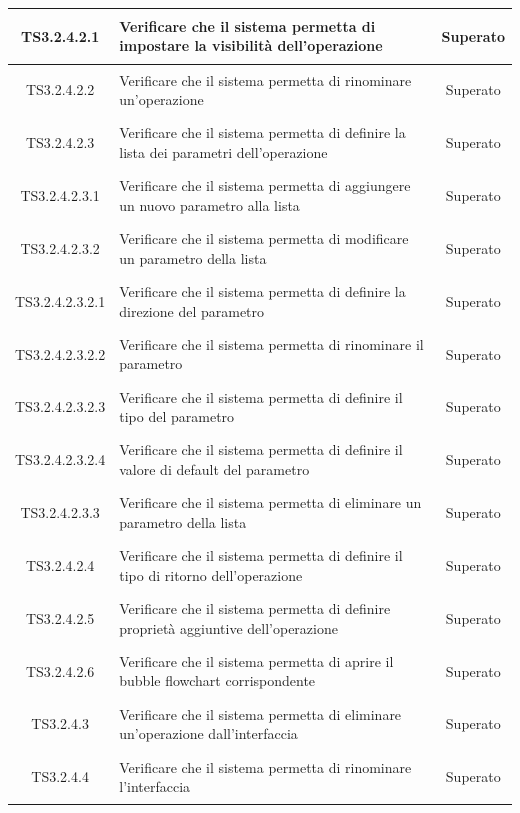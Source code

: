 \documentclass[../PianoDiQualifica.tex]{subfiles}
\begin{document}
\begin{longtable}{|c|>{\centering}p{10cm}|c|}
	\hline
	\hypertarget{TS3.2.4.2.1}{TS3.2.4.2.1} & Verificare che il sistema permetta di impostare la visibilità dell'operazione & Superato \\
	\hline
	\hypertarget{TS3.2.4.2.2}{TS3.2.4.2.2} & Verificare che il sistema permetta di rinominare un'operazione & Superato \\
	\hline
	\hypertarget{TS3.2.4.2.3}{TS3.2.4.2.3} & Verificare che il sistema permetta di definire la lista dei parametri dell'operazione & Superato \\
	\hline
	\hypertarget{TS3.2.4.2.3.1}{TS3.2.4.2.3.1} & Verificare che il sistema permetta di aggiungere un nuovo parametro alla lista & Superato\\
	\hline
	\hypertarget{TS3.2.4.2.3.2}{TS3.2.4.2.3.2} & Verificare che il sistema permetta di modificare un parametro della lista & Superato\\
	\hline
	\hypertarget{TS3.2.4.2.3.2.1}{TS3.2.4.2.3.2.1} & Verificare che il sistema permetta di definire la direzione del parametro & Superato\\
	\hline
	\hypertarget{TS3.2.4.2.3.2.2}{TS3.2.4.2.3.2.2} & Verificare che il sistema permetta di rinominare il parametro & Superato \\
	\hline
	\hypertarget{TS3.2.4.2.3.2.3}{TS3.2.4.2.3.2.3} & Verificare che il sistema permetta di definire il tipo del parametro & Superato\\
	\hline
	\hypertarget{TS3.2.4.2.3.2.4}{TS3.2.4.2.3.2.4} & Verificare che il sistema permetta di definire il valore di default del parametro & Superato \\
	\hline
	\hypertarget{TS3.2.4.2.3.3}{TS3.2.4.2.3.3} & Verificare che il sistema permetta di eliminare un parametro della lista & Superato \\
	\hline
	\hypertarget{TS3.2.4.2.4}{TS3.2.4.2.4} & Verificare che il sistema permetta di definire il tipo di ritorno dell'operazione & Superato \\
	\hline
	\hypertarget{TS3.2.4.2.5}{TS3.2.4.2.5} & Verificare che il sistema permetta di definire proprietà aggiuntive dell'operazione & Superato \\
	\hline
	\hypertarget{TS3.2.4.2.6}{TS3.2.4.2.6} & Verificare che il sistema permetta di aprire il bubble flowchart corrispondente & Superato \\
	\hline
	\hypertarget{TS3.2.4.3}{TS3.2.4.3} & Verificare che il sistema permetta di eliminare un'operazione dall'interfaccia & Superato \\
	\hline
	\hypertarget{TS3.2.4.4}{TS3.2.4.4} & Verificare che il sistema permetta di rinominare l'interfaccia & Superato \\

\end{longtable}
\end{document}
